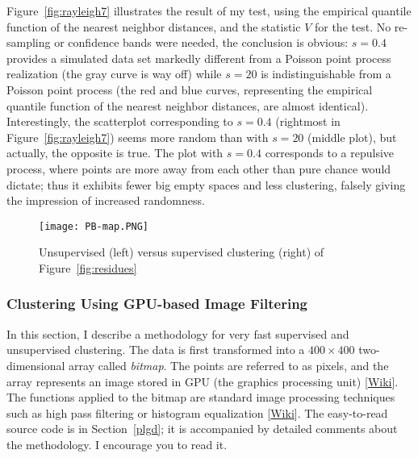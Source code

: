 \documentclass[10pt]{article}
\begin{document}
Figure~\ref{fig:rayleigh7} illustrates the result of my test, using the empirical quantile function of the nearest neighbor distances, and the statistic $V$ for the test. No re-sampling or confidence bands were needed, the conclusion is obvious: $s=0.4$ provides a simulated data set markedly different from a Poisson point process realization (the gray curve is way off) while $s=20$ is indistinguishable from a Poisson point process (the red and blue curves, representing the empirical quantile function of the \textcolor{index}{nearest neighbor distances}, are almost identical). Interestingly, the scatterplot corresponding to $s=0.4$ (rightmost in Figure~\ref{fig:rayleigh7}) seems more random than with $s=20$ (middle plot), but actually, the opposite is true. The plot with $s=0.4$ corresponds to a \textcolor{index}{repulsive process}, where points are more away from each other than pure chance would dictate; thus it exhibits fewer big empty spaces and less clustering, falsely giving the impression of increased randomness.

\begin{figure}[H]
\centering
\texttt{[image: PB-map.PNG]}
\caption{Unsupervised (left) versus supervised clustering (right) of Figure~\ref{fig:residues}}
\label{fig:map}
\end{figure}

\subsubsection{Clustering Using GPU-based Image Filtering}\label{spa2}

In this section, I describe a methodology for very fast supervised and unsupervised
\textcolor{index}{clustering}. The data is first transformed into a
$400 \times 400$ two-dimensional array called {\em bitmap}. The points are referred to as pixels, and the array represents an image stored in
\textcolor{index}{GPU}
(the graphics processing unit) [\href{https://en.wikipedia.org/wiki/General-purpose_computing_on_graphics_processing_units}{Wiki}]. The functions applied to the bitmap are standard image processing techniques such as high pass \textcolor{index}{filtering} or
\textcolor{index}{histogram equalization} [\href{https://en.wikipedia.org/wiki/Histogram_equalization}{Wiki}].
The easy-to-read source code is in Section~\ref{plgd}; it is accompanied by detailed comments about the methodology. I encourage you to read it.
\end{document}
